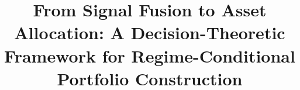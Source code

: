 \documentclass{singlecol-new}
\theoremstyle{TH}{
\newtheorem{lemma}{Lemma}
\newtheorem{theorem}[lemma]{Theorem}
\newtheorem{corrolary}[lemma]{Corrolary}
\newtheorem{conjecture}[lemma]{Conjecture}
\newtheorem{proposition}[lemma]{Proposition}
\newtheorem{claim}[lemma]{Claim}
\newtheorem{stheorem}[lemma]{Wrong Theorem}
\newtheorem{algorithm}{Algorithm}
}
\theoremstyle{THrm}{
\newtheorem{definition}{Definition}[section]
\newtheorem{question}{Question}[section]
\newtheorem{remark}{Remark}
\newtheorem{scheme}{Scheme}
}
\theoremstyle{THhit}{
\newtheorem{case}{Case}[section]
}
\begin{document}
%

\setcounter{page}{1}






\BottomCatch


\subtitle{}

\title{From Signal Fusion to Asset Allocation: A Decision-Theoretic Framework for Regime-Conditional Portfolio Construction}

%
%
%
%
%
%

%
%
%
%
%
%
%
\end{document}
